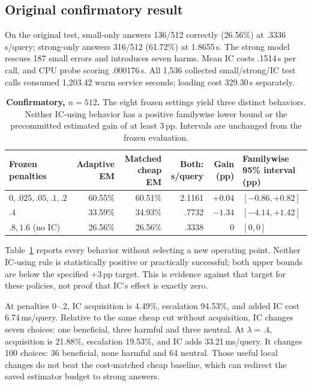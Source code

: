 \documentclass[11pt]{article}
\newcommand{\pp}{\,\text{pp}}
\begin{document}
\subsection{Original confirmatory result}
\label{sec:confirmatory}
On the original test, small-only answers 136/512 correctly (26.56\%) at .3336\,s/query; strong-only answers 316/512 (61.72\%) at 1.8655\,s. The strong model rescues 187 small errors and introduces seven harms. Mean IC costs .1514\,s per call, and CPU probe scoring .000176\,s. All 1,536 collected small/strong/IC test calls consumed 1,203.42 warm service seconds; loading cost 329.30\,s separately.

\begin{table}[t]
\centering\small
\begin{tabular}{lrrrrl}
\toprule
Frozen penalties & Adaptive EM & Matched cheap EM & Both: s/query & Gain (pp) & Familywise 95\% interval (pp) \\
\midrule
$0,.025,.05,.1,.2$ & 60.55\% & 60.51\% & 2.1161 & $+0.04$ & $[-0.86,+0.82]$ \\
$.4$ & 33.59\% & 34.93\% & .7732 & $-1.34$ & $[-4.14,+1.42]$ \\
$.8,1.6$ (no IC) & 26.56\% & 26.56\% & .3338 & $0$ & $[0,0]$ \\
\bottomrule
\end{tabular}
\caption{\textbf{Confirmatory, $n=512$.} The eight frozen settings yield three distinct behaviors. Neither IC-using behavior has a positive familywise lower bound or the precommitted estimated gain of at least 3\,pp. Intervals are unchanged from the frozen evaluation.}
\label{tab:confirmatory}
\end{table}

Table~\ref{tab:confirmatory} reports every behavior without selecting a new operating point. Neither IC-using rule is statistically positive or practically successful; both upper bounds are below the specified $+3\pp$ target. This is evidence against that target for these policies, not proof that IC's effect is exactly zero.

At penalties 0--.2, IC acquisition is 4.49\%, escalation 94.53\%, and added IC cost 6.74\,ms/query. Relative to the same cheap cut without acquisition, IC changes seven choices: one beneficial, three harmful and three neutral. At $\lambda=.4$, acquisition is 21.88\%, escalation 19.53\%, and IC adds 33.21\,ms/query. It changes 100 choices: 36 beneficial, none harmful and 64 neutral. Those useful local changes do not beat the cost-matched cheap baseline, which can redirect the saved estimator budget to strong answers.
\end{document}
